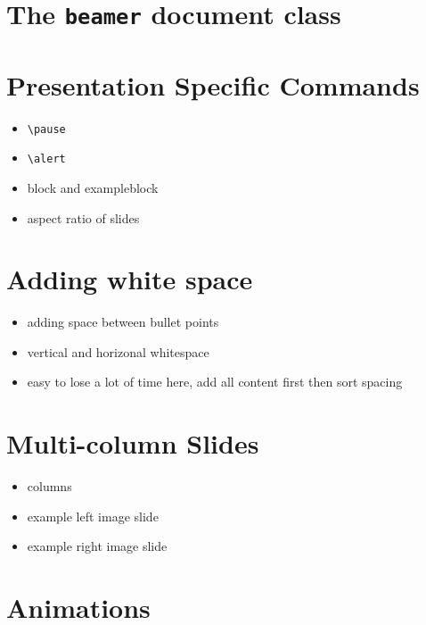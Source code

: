 \documentclass[
]{book}
\providecommand{\tightlist}{%
  \setlength{\itemsep}{0pt}\setlength{\parskip}{0pt}}
\begin{document}
\hypertarget{the-beamer-document-class}{%
\section{\texorpdfstring{The \texttt{beamer} document class}{The beamer document class}}\label{the-beamer-document-class}}

\hypertarget{presentation-specific-commands}{%
\section{Presentation Specific Commands}\label{presentation-specific-commands}}

\begin{itemize}
\tightlist
\item
  \texttt{\textbackslash{}pause}
\item
  \texttt{\textbackslash{}alert}
\item
  block and exampleblock
\item
  aspect ratio of slides
\end{itemize}

\hypertarget{adding-white-space}{%
\section{Adding white space}\label{adding-white-space}}

\begin{itemize}
\tightlist
\item
  adding space between bullet points
\item
  vertical and horizonal whitespace
\item
  easy to lose a lot of time here, add all content first then sort spacing
\end{itemize}

\hypertarget{multi-column-slides}{%
\section{Multi-column Slides}\label{multi-column-slides}}

\begin{itemize}
\tightlist
\item
  columns
\item
  example left image slide
\item
  example right image slide
\end{itemize}

\hypertarget{animations}{%
\section{Animations}\label{animations}}
\end{document}
